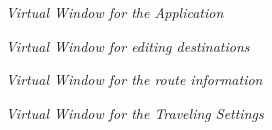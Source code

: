 



 

  




\begin{figure}
 
\begin{center}

  \caption{\emph{Virtual Window for the Application}}
  

\end{center}    
\end{figure}


\begin{figure}
 
\begin{center}

  \caption{\emph{Virtual Window for editing destinations}}
  

\end{center}    
\end{figure}


\begin{figure}
 
\begin{center}

  \caption{\emph{Virtual Window for the route information}}
  

\end{center}    
\end{figure}

\begin{figure}
 
\begin{center}

  \caption{\emph{Virtual Window for the Traveling Settings}}
  

\end{center}    
\end{figure}


